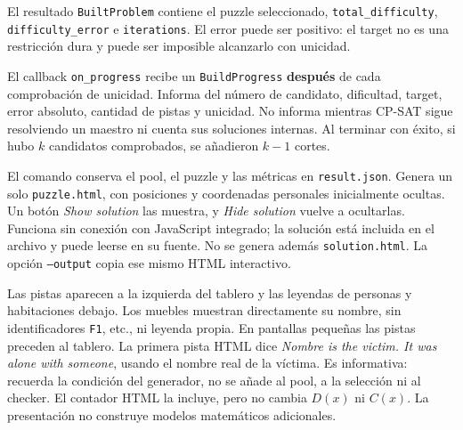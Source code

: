 \documentclass[11pt,a4paper]{article}
\begin{document}
El resultado \texttt{BuiltProblem} contiene el puzzle seleccionado,
\texttt{total\_difficulty}, \texttt{difficulty\_error} e
\texttt{iterations}. El error puede ser positivo: el target no es una
restricci\'on dura y puede ser imposible alcanzarlo con unicidad.

El callback \texttt{on\_progress} recibe un \texttt{BuildProgress}
\textbf{despu\'es} de cada comprobaci\'on de unicidad. Informa del
n\'umero de candidato, dificultad, target, error absoluto, cantidad
de pistas y unicidad. No informa mientras CP-SAT sigue resolviendo
un maestro ni cuenta sus soluciones internas. Al terminar con \'exito,
si hubo $k$ candidatos comprobados, se a\~nadieron $k-1$ cortes.

El comando conserva el pool, el puzzle y las m\'etricas en
\texttt{result.json}. Genera un solo \texttt{puzzle.html}, con
posiciones y coordenadas personales inicialmente ocultas. Un bot\'on
\emph{Show solution} las muestra, y \emph{Hide solution} vuelve a
ocultarlas. Funciona sin conexi\'on con JavaScript integrado; la
soluci\'on est\'a incluida en el archivo y puede leerse en su fuente.
No se genera adem\'as \texttt{solution.html}. La opci\'on
\texttt{--output} copia ese mismo HTML interactivo.

Las pistas aparecen a la izquierda del tablero y las leyendas de
personas y habitaciones debajo. Los muebles muestran directamente
su nombre, sin identificadores \texttt{F1}, etc., ni leyenda propia.
En pantallas peque\~nas las pistas preceden al tablero.
La primera pista HTML dice
\emph{Nombre is the victim. It was alone with someone}, usando el
nombre real de la v\'ictima. Es informativa: recuerda la condici\'on
del generador, no se a\~nade al pool, a la selecci\'on ni al checker.
El contador HTML la incluye, pero no cambia $D(x)$ ni $C(x)$.
La presentaci\'on no construye modelos matem\'aticos adicionales.
\end{document}
